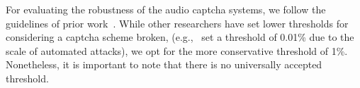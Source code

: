 For evaluating the robustness of the 
audio captcha systems, we follow the guidelines of prior work~\cite{bursztein2011failure}.
While other researchers have set lower thresholds for considering a captcha scheme 
broken, (e.g.,~\cite{Chellapilla} set a threshold of 0.01\% due to the scale of 
automated attacks), we opt for the more conservative threshold of 1\%. Nonetheless,
it is important to note that there is no universally accepted threshold.
